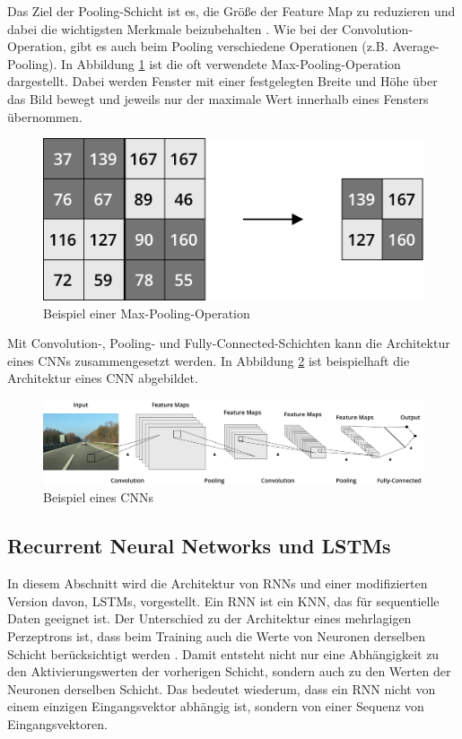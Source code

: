 Das Ziel der Pooling-Schicht ist es, die Größe der Feature Map zu reduzieren und dabei die wichtigsten Merkmale beizubehalten \cite{scherer2010evaluation}. Wie bei der Convolution-Operation, gibt es auch beim Pooling verschiedene Operationen (z.B. Average-Pooling). In Abbildung \ref{fig_pool_operation} ist die oft verwendete Max-Pooling-Operation dargestellt. Dabei werden Fenster mit einer festgelegten Breite und Höhe über das Bild bewegt und jeweils nur der maximale Wert innerhalb eines Fensters übernommen.

\begin{figure}[h]
\centering
\includegraphics[scale=0.4]{images/pool_operation.pdf}
\caption{Beispiel einer Max-Pooling-Operation}
\label{fig_pool_operation}
\end{figure}

Mit Convolution-, Pooling- und Fully-Connected-Schichten kann die Architektur eines \acp{CNN} zusammengesetzt werden. In Abbildung \ref{fig_cnn} ist beispielhaft die Architektur eines \ac{CNN} abgebildet.


\begin{figure}[h]
\centering
\includegraphics[scale=0.2]{images/cnn.pdf}
\caption{Beispiel eines \aclp{CNN}}
\label{fig_cnn}
\end{figure}


\subsection{Recurrent Neural Networks und LSTMs}
\label{grundlagen_nn_rnn}

In diesem Abschnitt wird die Architektur von \acfp{RNN} und einer modifizierten Version davon, \acfp{LSTM}, vorgestellt. Ein \ac{RNN} ist ein \ac{KNN}, das für sequentielle Daten geeignet ist. Der Unterschied zu der Architektur eines mehrlagigen Perzeptrons ist, dass beim Training auch die Werte von Neuronen derselben Schicht berücksichtigt werden \cite{graves2012rnn}. Damit entsteht nicht nur eine Abhängigkeit zu den Aktivierungswerten der vorherigen Schicht, sondern auch zu den Werten der Neuronen derselben Schicht. Das bedeutet wiederum, dass ein \ac{RNN} nicht von einem einzigen Eingangsvektor abhängig ist, sondern von einer Sequenz von Eingangsvektoren. 

